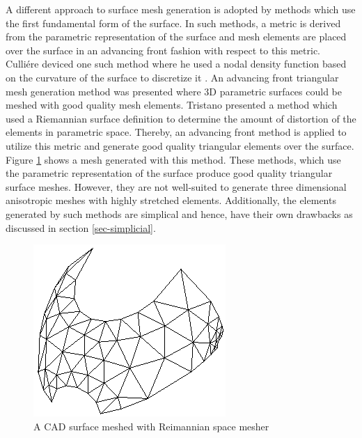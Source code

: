 A different approach to surface mesh generation is adopted by methods which use the first fundamental form of the surface. In such methods, a metric is derived from the parametric representation of the surface and mesh elements are placed over the surface in an advancing front fashion with respect to this metric. Culli\'ere deviced one such method where he used a nodal density function based on the curvature of the surface to discretize it \cite{cuilliere1998adaptive}. An advancing front triangular mesh generation method was presented where 3D parametric surfaces could be meshed with good quality mesh elements. Tristano \etal \cite{tristano1998advancing} presented a method which used a Riemannian surface definition to determine the amount of distortion of the elements in parametric space. Thereby, an advancing front method is applied to utilize this metric and generate good quality triangular elements over the surface. Figure \ref{fig-joseph} shows a mesh generated with this method. These methods, which use the parametric representation of the surface produce good quality triangular surface meshes. However, they are not well-suited to generate three dimensional anisotropic meshes with highly stretched elements. Additionally, the elements generated by such methods are simplical and hence, have their own drawbacks as discussed in section \ref{sec-simplicial}.

\begin{figure}
	\centering
	\begin{minipage}{0.45\linewidth}
		\centering
		\includegraphics[width=\linewidth]{img/intro/lit/joseph.png}
		\caption{A CAD surface meshed with Reimannian space mesher}
		\label{fig-joseph}
	\end{minipage}
\end{figure}

